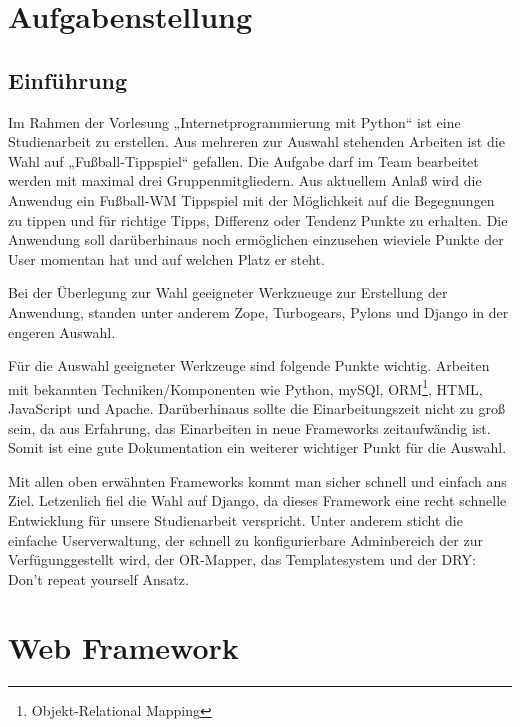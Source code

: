 




  
\newpage

\tableofcontents
\newpage
\chapter{Aufgabenstellung}
\section{Einführung}
Im Rahmen der Vorlesung „Internetprogrammierung mit Python“ ist eine
Studienarbeit zu erstellen. Aus mehreren zur Auswahl stehenden Arbeiten ist die
Wahl auf „Fußball-Tippspiel“ gefallen. Die Aufgabe darf im Team bearbeitet
werden mit maximal drei Gruppenmitgliedern. Aus aktuellem Anlaß wird die
Anwendug ein Fußball-WM Tippspiel mit der Möglichkeit auf die Begegnungen zu
tippen und für richtige Tipps, Differenz oder Tendenz Punkte zu erhalten. Die
Anwendung soll darüberhinaus noch ermöglichen einzusehen wieviele Punkte der
User momentan hat und auf welchen Platz er steht.

Bei der Überlegung zur Wahl geeigneter Werkzueuge zur Erstellung der Anwendung,
standen unter anderem Zope, Turbogears, Pylons und Django in der engeren
Auswahl.

Für die Auswahl geeigneter Werkzeuge sind folgende Punkte wichtig.
Arbeiten mit bekannten Techniken/Komponenten wie Python, mySQl,
ORM\footnote{Objekt-Relational Mapping}, HTML, JavaScript und Apache. 
Darüberhinaus sollte die Einarbeitungszeit nicht zu groß sein, da aus
Erfahrung, das Einarbeiten in neue Frameworks zeitaufwändig ist. Somit ist eine
gute Dokumentation ein weiterer wichtiger Punkt für die Auswahl.

Mit allen oben erwähnten Frameworks kommt man sicher schnell und einfach ans
Ziel. Letzenlich fiel die Wahl auf Django, da dieses Framework eine recht
schnelle Entwicklung für unsere Studienarbeit verspricht. Unter anderem sticht
die einfache Userverwaltung, der schnell zu konfigurierbare Adminbereich der
zur Verfügunggestellt wird, der OR-Mapper, das Templatesystem und der DRY: Don't
repeat yourself Ansatz. 

\chapter{Web Framework}
